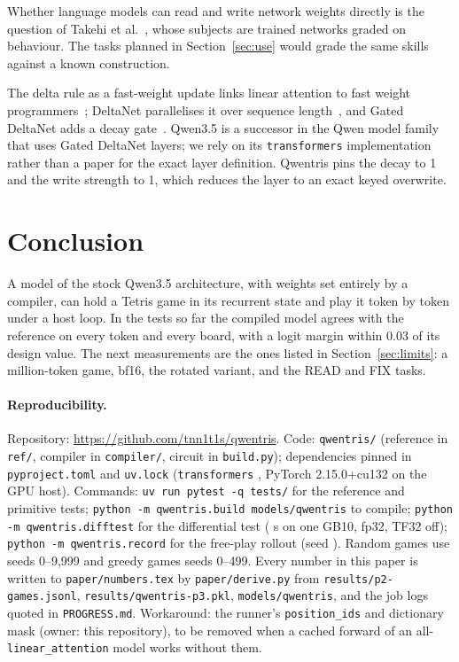 \documentclass[11pt]{article}
\begin{document}
Whether language models can read and write network weights directly is the question of Takehi et al.~\cite{takehi2026sparks}, whose subjects are trained networks graded on behaviour. The tasks planned in Section~\ref{sec:use} would grade the same skills against a known construction.

The delta rule as a fast-weight update links linear attention to fast weight programmers~\cite{schlag2021linear}; DeltaNet parallelises it over sequence length~\cite{yang2024parallelizing}, and Gated DeltaNet adds a decay gate~\cite{yang2024gated}. Qwen3.5 is a successor in the Qwen model family~\cite{qwen3report} that uses Gated DeltaNet layers; we rely on its \texttt{transformers} implementation rather than a paper for the exact layer definition. Qwentris pins the decay to 1 and the write strength to 1, which reduces the layer to an exact keyed overwrite.

\section{Conclusion}

A model of the stock Qwen3.5 architecture, with weights set entirely by a compiler, can hold a Tetris game in its recurrent state and play it token by token under a host loop. In the tests so far the compiled model agrees with the reference on every token and every board, with a logit margin within 0.03 of its design value. The next measurements are the ones listed in Section~\ref{sec:limits}: a million-token game, bf16, the rotated variant, and the READ and FIX tasks.

\paragraph{Reproducibility.} \sloppy Repository: \url{https://github.com/tnn1t1s/qwentris}. Code: \texttt{qwentris/} (reference in \texttt{ref/}, compiler in \texttt{compiler/}, circuit in \texttt{build.py}); dependencies pinned in \texttt{pyproject.toml} and \texttt{uv.lock} (\texttt{transformers} \nTfVersion{}, PyTorch 2.15.0+cu132 on the GPU host). Commands: \texttt{uv run pytest -q tests/} for the reference and primitive tests; \texttt{python -m qwentris.build models/qwentris} to compile; \texttt{python -m qwentris.difftest} for the differential test (\nPtwoSeconds{} s on one GB10, fp32, TF32 off); \texttt{python -m qwentris.record} for the free-play rollout (seed \nPthreeSeed). Random games use seeds 0--9{,}999 and greedy games seeds 0--499. Every number in this paper is written to \texttt{paper/numbers.tex} by \texttt{paper/derive.py} from \texttt{results/p2-games.jsonl}, \texttt{results/qwentris-p3.pkl}, \texttt{models/qwentris}, and the job logs quoted in \texttt{PROGRESS.md}. Workaround: the runner's \texttt{position\_ids} and dictionary mask (owner: this repository), to be removed when a cached forward of an all-\texttt{linear\_attention} model works without them.



\end{document}
